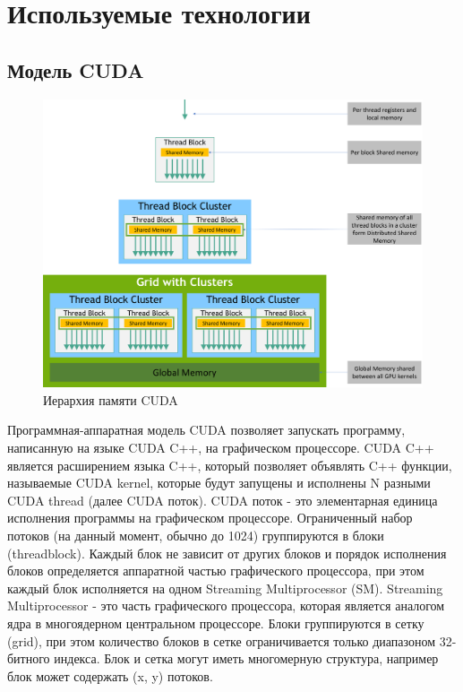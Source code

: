 \section{Используемые технологии}
\subsection{Модель CUDA}
\begin{figure}[h]
    \centering
    \includegraphics[scale=0.4]{src/images/memory-hierarchy.png}
    \caption{Иерархия памяти CUDA}
    \label{fig:memory_hierarchy}
\end{figure}

Программная-аппаратная модель CUDA позволяет запускать программу, написанную на языке CUDA C++, на графическом процессоре.
CUDA C++ является расширением языка C++, который позволяет объявлять C++ функции, называемые CUDA kernel,
которые будут запущены и исполнены N разными CUDA thread (далее CUDA поток). CUDA поток - это элементарная единица исполнения программы на
графическом процессоре. Ограниченный набор потоков (на данный момент, обычно до 1024) группируются в блоки (threadblock).
Каждый блок не зависит от других блоков и порядок исполнения блоков определяется аппаратной частью графического процессора, при этом каждый блок
исполняется на одном Streaming Multiprocessor (SM). Streaming Multiprocessor - это часть графического процессора, которая является
аналогом ядра в многоядерном центральном процессоре.
Блоки группируются в сетку (grid), при этом количество блоков в сетке ограничивается только диапазоном 32-битного индекса. Блок и сетка могут
иметь многомерную структура, например блок может содержать (x, y) потоков.

